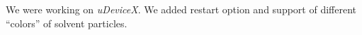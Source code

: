 We were working on \textit{uDeviceX}. We added restart option and
support of different ``colors'' of solvent particles.
